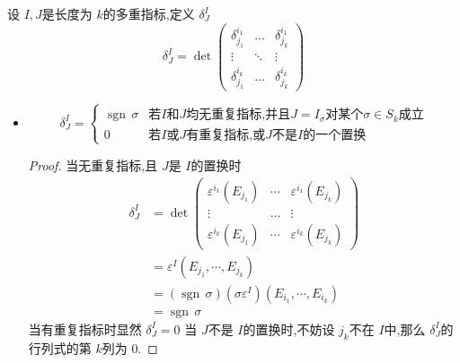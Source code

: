 \documentclass[../../几何与拓扑.tex]{subfiles}
\begin{document}
\begin{definition}
    设 $ I,J $是长度为 $ k $的多重指标,定义 $ \delta_{J}^{I} $ $$
    \delta_J^I=\det\begin{pmatrix}\delta_{j_1}^{i_1}&\ldots&\delta_{j_k}^{i_1}\\\vdots&\ddots&\vdots\\\delta_{j_1}^{i_k}&\ldots&\delta_{j_k}^{i_k}\end{pmatrix}
    $$   
\end{definition}
\begin{remark}
    \begin{itemize}
        \item $$
        \delta_{J}^{I} = \begin{cases} \operatorname{sgn}\,\sigma& \text{若} I \text{和} J \text{均无重复指标,并且} J= I_{\sigma} \text{对某个} \sigma \in S_{k}\text{成立}  \\ 
         0 & \text{若} I \text{或} J \text{有重复指标,或} J \text{不是} I \text{的一个置换}   \end{cases} 
        $$ 
        \begin{proof}
            当无重复指标,且 $ J $是 $ I $的置换时  
            $$
            \begin{aligned}
            \delta_{J}^{I } & = \det  \begin{pmatrix} 
                 \varepsilon^{i_1}\left( E_{j_1} \right) & \cdots  &  \varepsilon ^{i_1} \left( E_{j_{k}} \right)  \\ 
                 \vdots & \ldots &\vdots \\ 
                   \varepsilon^{i_{k}}\left( E_{j_{1}} \right)  & \cdots & \varepsilon^{i_{k}}\left( {E_{j_{k}}} \right) 
            \end{pmatrix}  \\ 
             & = \varepsilon^{I} \left( E_{j_1},\cdots ,E_{j_{k}} \right) \\ 
              & =\left( \operatorname{sgn}\,\sigma \right)\left(   \sigma \varepsilon^{I}  \right) \left( E_{i_1},\cdots ,E_{i_{k}} \right)\\ 
               & = \operatorname{sgn}\,\sigma 
            \end{aligned}
            $$
            当有重复指标时显然 $ \delta_{J}^{I}=0 $ 
            当 $ J $不是 $ I $的置换时,不妨设 $ j_{k} $不在 $ I $中,那么 $ \delta_{J}^{I} $的行列式的第 $ k $列为 $ 0 $.     
        \end{proof}
    \end{itemize}
    
\end{remark}
\end{document}

